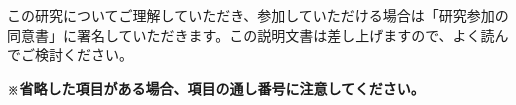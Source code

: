 \documentclass[a4paper,11pt,lualatex,ja=standard]{bxjsarticle}
\begin{document}

%

%

%

%

\vfill

この研究についてご理解していただき、参加していただける場合は「研究参加の同意書」に署名していただきます。この説明文書は差し上げますので、よく読んでご検討ください。

\vspace{1em}

{\small \textbf{※省略した項目がある場合、項目の通し番号に注意してください。}}
\end{document}
